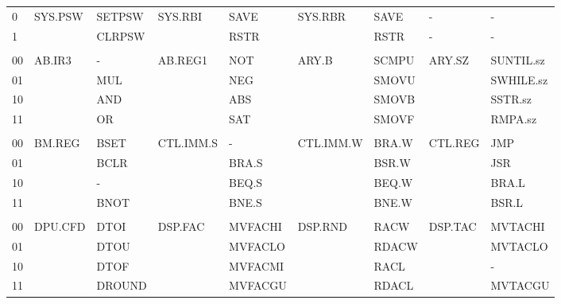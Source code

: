 \begin{table}
\begin{center}
\begin{tabular}{l|ll|ll|ll|ll}
0    & SYS.PSW    & SETPSW   & SYS.RBI   & SAVE            & SYS.RBR    & SAVE            & -          & -         \\
1    &            & CLRPSW   &           & RSTR            &            & RSTR            & -          & -         \\
     &            &          &           &                 &            &                 &            &           \\
00   & AB.IR3     & -        & AB.REG1   & NOT             & ARY.B      & SCMPU           & ARY.SZ     & SUNTIL.sz \\
01   &            & MUL      &           & NEG             &            & SMOVU           &            & SWHILE.sz \\
10   &            & AND      &           & ABS             &            & SMOVB           &            & SSTR.sz   \\
11   &            & OR       &           & SAT             &            & SMOVF           &            & RMPA.sz   \\
     &            &          &           &                 &            &                 &            &           \\
00   & BM.REG     & BSET     & CTL.IMM.S & -               & CTL.IMM.W  & BRA.W           & CTL.REG    & JMP       \\
01   &            & BCLR     &           & BRA.S           &            & BSR.W           &            & JSR       \\
10   &            & -        &           & BEQ.S           &            & BEQ.W           &            & BRA.L     \\
11   &            & BNOT     &           & BNE.S           &            & BNE.W           &            & BSR.L     \\
     &            &          &           &                 &            &                 &            &           \\
00   & DPU.CFD    & DTOI     & DSP.FAC   & MVFACHI         & DSP.RND    & RACW            & DSP.TAC    & MVTACHI   \\
01   &            & DTOU     &           & MVFACLO         &            & RDACW           &            & MVTACLO   \\
10   &            & DTOF     &           & MVFACMI         &            & RACL            &            & -         \\
11   &            & DROUND   &           & MVFACGU         &            & RDACL           &            & MVTACGU   \\

\end{tabular}
\end{center}
\end{table}
